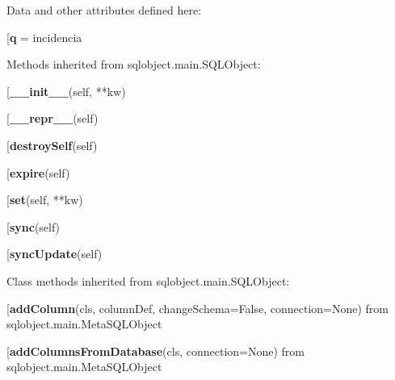 Data and other attributes defined here:\\
\begin{description}\item[{\bf q} = incidencia\end{description}


Methods inherited from sqlobject.main.SQLObject:\\
\begin{description}\item[{\bf \_\_init\_\_}(self, **kw)\end{description}

\begin{description}\item[{\bf \_\_repr\_\_}(self)\end{description}

\begin{description}\item[{\bf destroySelf}(self)\end{description}

\begin{description}\item[{\bf expire}(self)\end{description}

\begin{description}\item[{\bf set}(self, **kw)\end{description}

\begin{description}\item[{\bf sync}(self)\end{description}

\begin{description}\item[{\bf syncUpdate}(self)\end{description}


Class methods inherited from sqlobject.main.SQLObject:\\
\begin{description}\item[{\bf addColumn}(cls, columnDef, changeSchema=False, connection=None) from sqlobject.main.MetaSQLObject\end{description}

\begin{description}\item[{\bf addColumnsFromDatabase}(cls, connection=None) from sqlobject.main.MetaSQLObject\end{description}

